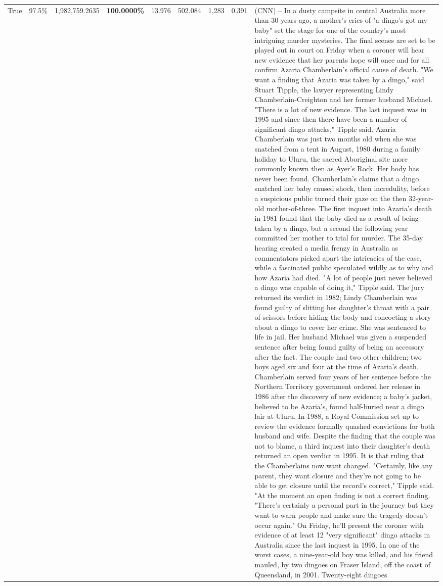 \begin{table}[H]
\begin{tabular}{lllrlllll}
True & 97.5\% & 1,982,759.2635 & \bfseries \color{red} 100.0000\% & 13.976 & 502.084 & 1,283 & 0.391 & (CNN) -- In a dusty campsite in central Australia more than 30 years ago, a mother's cries of "a dingo's got my baby" set the stage for one of the country's most intriguing murder mysteries. The final scenes are set to be played out in court on Friday when a coroner will hear new evidence that her parents hope will once and for all confirm Azaria Chamberlain's official cause of death. "We want a finding that Azaria was taken by a dingo," said Stuart Tipple, the lawyer representing Lindy Chamberlain-Creighton and her former husband Michael. "There is a lot of new evidence. The last inquest was in 1995 and since then there have been a number of significant dingo attacks," Tipple said. Azaria Chamberlain was just two months old when she was snatched from a tent in August, 1980 during a family holiday to Uluru, the sacred Aboriginal site more commonly known then as Ayer's Rock. Her body has never been found. Chamberlain's claims that a dingo snatched her baby caused shock, then incredulity, before a suspicious public turned their gaze on the then 32-year-old mother-of-three. The first inquest into Azaria's death in 1981 found that the baby died as a result of being taken by a dingo, but a second the following year committed her mother to trial for murder. The 35-day hearing created a media frenzy in Australia as commentators picked apart the intricacies of the case, while a fascinated public speculated wildly as to why and how Azaria had died. "A lot of people just never believed a dingo was capable of doing it," Tipple said. The jury returned its verdict in 1982; Lindy Chamberlain was found guilty of slitting her daughter's throat with a pair of scissors before hiding the body and concocting a story about a dingo to cover her crime. She was sentenced to life in jail. Her husband Michael was given a suspended sentence after being found guilty of being an accessory after the fact. The couple had two other children; two boys aged six and four at the time of Azaria's death. Chamberlain served four years of her sentence before the Northern Territory government ordered her release in 1986 after the discovery of new evidence; a baby's jacket, believed to be Azaria's, found half-buried near a dingo lair at Uluru. In 1988, a Royal Commission set up to review the evidence formally quashed convictions for both husband and wife. Despite the finding that the couple was not to blame, a third inquest into their daughter's death returned an open verdict in 1995. It is that ruling that the Chamberlains now want changed. "Certainly, like any parent, they want closure and they're not going to be able to get closure until the record's correct," Tipple said. "At the moment an open finding is not a correct finding. "There's certainly a personal part in the journey but they want to warn people and make sure the tragedy doesn't occur again." On Friday, he'll present the coroner with evidence of at least 12 "very significant" dingo attacks in Australia since the last inquest in 1995. In one of the worst cases, a nine-year-old boy was killed, and his friend mauled, by two dingoes on Fraser Island, off the coast of Queensland, in 2001. Twenty-eight dingoes 
\end{tabular}
\end{table}
